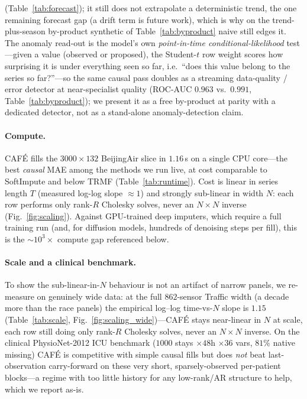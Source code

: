 \documentclass[10pt,twocolumn]{article}
\newcommand{\cafe}{CAF\'E}
\begin{document}
(Table~\ref{tab:forecast}); it still does not extrapolate a deterministic trend, the one
remaining forecast gap (a drift term is future work), which is why on the trend-plus-season
by-product synthetic of Table~\ref{tab:byproduct} naive still edges it. The anomaly read-out is
the model's own \emph{point-in-time conditional-likelihood} test---given a value
(observed or proposed), the Student-$t$ row weight scores how surprising it is under
everything seen so far, i.e.\ ``does this value belong to the series so far?''---so the
same causal pass doubles as a streaming data-quality / error detector at near-specialist
quality (ROC-AUC $0.963$ vs.\ $0.991$, Table~\ref{tab:byproduct}); we present it as a
free by-product at parity with a dedicated detector, not as a stand-alone
anomaly-detection claim.





\paragraph{Compute.} \cafe{} fills the $3000\times132$ BeijingAir slice in
$1.16$\,s on a single CPU core---the best \emph{causal} MAE among the methods we
run live, at cost comparable to SoftImpute and below TRMF (Table~\ref{tab:runtime}). Cost is
linear in series length $T$ (measured log-log slope $\approx\!1$) and strongly
sub-linear in width $N$: each row performs only rank-$R$ Cholesky solves, never
an $N\times N$ inverse (Fig.~\ref{fig:scaling}). Against GPU-trained deep
imputers, which require a full training run (and, for diffusion models, hundreds
of denoising steps per fill), this is the $\sim\!10^3\times$ compute gap
referenced below.


\paragraph{Scale and a clinical benchmark.} To show the sub-linear-in-$N$ behaviour
is not an artifact of narrow panels, we re-measure on genuinely wide data: at the
full $862$-sensor Traffic width (a decade more than the race panels) the empirical
log--log time-vs-$N$ slope is $1.15$ (Table~\ref{tab:scale},
Fig.~\ref{fig:scaling_wide})---\cafe{} stays near-linear in $N$ at scale, each row
still doing only rank-$R$ Cholesky solves, never an $N\times N$ inverse. On the
clinical PhysioNet-2012 ICU benchmark ($1000$ stays $\times48$h $\times36$ vars, $81\%$
native missing) \cafe{} is competitive with simple causal fills but does \emph{not}
beat last-observation carry-forward on these very short, sparsely-observed per-patient
blocks---a regime with too little history for any low-rank/AR structure to help, which
we report as-is.

\end{document}
